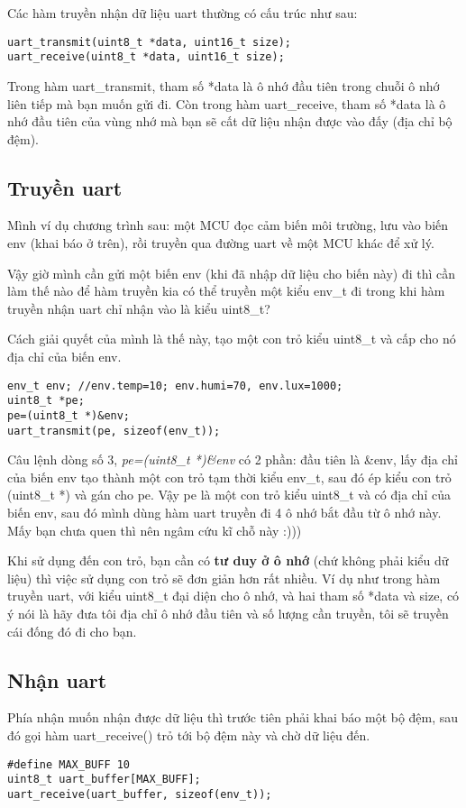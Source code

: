 Các hàm truyền nhận dữ liệu uart thường có cấu trúc như sau:
\begin{lstlisting}
uart_transmit(uint8_t *data, uint16_t size);
uart_receive(uint8_t *data, uint16_t size);
\end{lstlisting}

Trong hàm uart\_transmit, tham số *data là ô nhớ đầu tiên trong chuỗi ô nhớ liên tiếp mà bạn muốn gửi đi. Còn trong hàm uart\_receive, tham số *data là ô nhớ đầu tiên của vùng nhớ mà bạn sẽ cất dữ liệu nhận được vào đấy (địa chỉ bộ đệm).
\subsection{Truyền uart}

Mình ví dụ chương trình sau: một MCU đọc cảm biến môi trường, lưu vào biến env (khai báo ở trên), rồi truyền qua đường uart về một MCU khác để xử lý.


Vậy giờ mình cần gửi một biến env (khi đã nhập dữ liệu cho biến này) đi thì cần làm thế nào để hàm truyền kia có thể truyền một kiểu env\_t đi trong khi hàm truyền nhận uart chỉ nhận vào là kiểu uint8\_t?

Cách giải quyết của mình là thế này, tạo một con trỏ kiểu uint8\_t và cấp cho nó địa chỉ của biến env.
\begin{lstlisting}
env_t env; //env.temp=10; env.humi=70, env.lux=1000;
uint8_t *pe;
pe=(uint8_t *)&env;
uart_transmit(pe, sizeof(env_t));
\end{lstlisting}

Câu lệnh dòng số 3, \textit{pe=(uint8\_t *)\&env} có 2 phần: đầu tiên là \&env, lấy địa chỉ của biến env tạo thành một con trỏ tạm thời kiểu env\_t, sau đó ép kiểu con trỏ (uint8\_t *) và gán cho pe. Vậy pe là một con trỏ kiểu uint8\_t và có địa chỉ của biến env, sau đó mình dùng hàm uart truyền đi 4 ô nhớ bắt đầu từ ô nhớ này. Mấy bạn chưa quen thì nên ngâm cứu kĩ chỗ này :)))

Khi sử dụng đến con trỏ, bạn cần có \textbf{tư duy ở ô nhớ} (chứ không phải kiểu dữ liệu) thì việc sử dụng con trỏ sẽ đơn giản hơn rất nhiều. Ví dụ như trong hàm truyền uart, với kiểu uint8\_t đại diện cho ô nhớ, và hai tham số *data và size, có ý nói là hãy đưa tôi địa chỉ ô nhớ đầu tiên và số lượng cần truyền, tôi sẽ truyền cái đống đó đi cho bạn.
\subsection{Nhận uart}

Phía nhận muốn nhận được dữ liệu thì trước tiên phải khai báo một bộ đệm, sau đó gọi hàm uart\_receive() trỏ tới bộ đệm này và chờ dữ liệu đến.
\begin{lstlisting}
#define MAX_BUFF 10
uint8_t uart_buffer[MAX_BUFF];
uart_receive(uart_buffer, sizeof(env_t));
\end{lstlisting}

